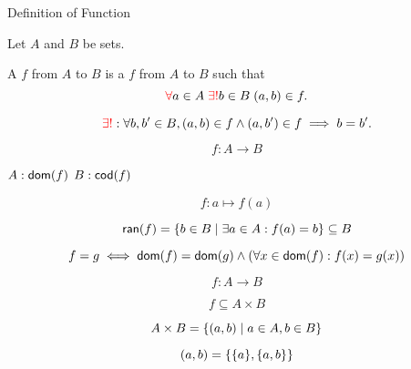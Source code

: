 \begin{frame}{}
  \begin{center}
    {\LARGE Definition of Function}
  \end{center}
\end{frame}

\begin{frame}{}

\end{frame}

\begin{frame}{}
\end{frame}

\begin{frame}{}
\end{frame}

\begin{frame}{}
  \begin{definition}[Function]
    Let $A$ and $B$ be sets.

    A  $f$ from $A$ to $B$ is a  $f$ from $A$ to $B$ such that
    \[
      \textcolor{red}{\forall} a \in A\; \textcolor{red}{\exists!} b \in B\; (a, b) \in f.
    \]
  \end{definition}

  \[
    \textcolor{red}{\exists!}: \forall b, b' \in B, (a, b) \in f \land (a, b') \in f \implies b = b'.
  \]

  \pause
  \[
    f: A \to B
  \]

  \centerline{$A: \textsf{dom}(f)$ \qquad $B: \textsf{cod}(f)$}

  \[
    f: a \mapsto f(a)
  \]

  \pause
  \[
    \textsf{ran}(f) = \{b \in B \mid \exists a \in A: f(a) = b\} \subseteq B
  \]
\end{frame}

\begin{frame}{}
  \[
    f = g \iff \textsf{dom}(f) = \textsf{dom}(g) \land (\forall x \in \textsf{dom}(f): f(x) = g(x))
  \]
\end{frame}

\begin{frame}{}
  \[
    f: A \to B
  \]

  \[
    f \subseteq A \times B
  \]

  \[
    A \times B = \{(a,b) \mid a \in A, b \in B\}
  \]

  \[
    (a,b) = \{\{a\}, \{a,b\}\}
  \]
\end{frame}
